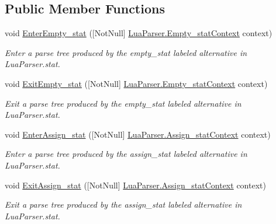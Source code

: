 \subsection*{Public Member Functions}
\begin{DoxyCompactItemize}
\item 
void \mbox{\hyperlink{interfacezlua_1_1_i_lua_listener_aaa6652e41dd59516afb02cde17c6a347}{Enter\+Empty\+\_\+stat}} (\mbox{[}Not\+Null\mbox{]} \mbox{\hyperlink{classzlua_1_1_lua_parser_1_1_empty__stat_context}{Lua\+Parser.\+Empty\+\_\+stat\+Context}} context)
\begin{DoxyCompactList}\small\item\em Enter a parse tree produced by the {\ttfamily empty\+\_\+stat} labeled alternative in Lua\+Parser.\+stat. \end{DoxyCompactList}\item 
void \mbox{\hyperlink{interfacezlua_1_1_i_lua_listener_a5d6586f89158ceb4a9e683bbc2463ef3}{Exit\+Empty\+\_\+stat}} (\mbox{[}Not\+Null\mbox{]} \mbox{\hyperlink{classzlua_1_1_lua_parser_1_1_empty__stat_context}{Lua\+Parser.\+Empty\+\_\+stat\+Context}} context)
\begin{DoxyCompactList}\small\item\em Exit a parse tree produced by the {\ttfamily empty\+\_\+stat} labeled alternative in Lua\+Parser.\+stat. \end{DoxyCompactList}\item 
void \mbox{\hyperlink{interfacezlua_1_1_i_lua_listener_a6c89bd1b72debe5db0a3bd633af3c6c9}{Enter\+Assign\+\_\+stat}} (\mbox{[}Not\+Null\mbox{]} \mbox{\hyperlink{classzlua_1_1_lua_parser_1_1_assign__stat_context}{Lua\+Parser.\+Assign\+\_\+stat\+Context}} context)
\begin{DoxyCompactList}\small\item\em Enter a parse tree produced by the {\ttfamily assign\+\_\+stat} labeled alternative in Lua\+Parser.\+stat. \end{DoxyCompactList}\item 
void \mbox{\hyperlink{interfacezlua_1_1_i_lua_listener_ad3a0df056fe6b0c23d11cad89f6091c7}{Exit\+Assign\+\_\+stat}} (\mbox{[}Not\+Null\mbox{]} \mbox{\hyperlink{classzlua_1_1_lua_parser_1_1_assign__stat_context}{Lua\+Parser.\+Assign\+\_\+stat\+Context}} context)
\begin{DoxyCompactList}\small\item\em Exit a parse tree produced by the {\ttfamily assign\+\_\+stat} labeled alternative in Lua\+Parser.\+stat. \end{DoxyCompactList}\item 

\end{DoxyCompactItemize}
